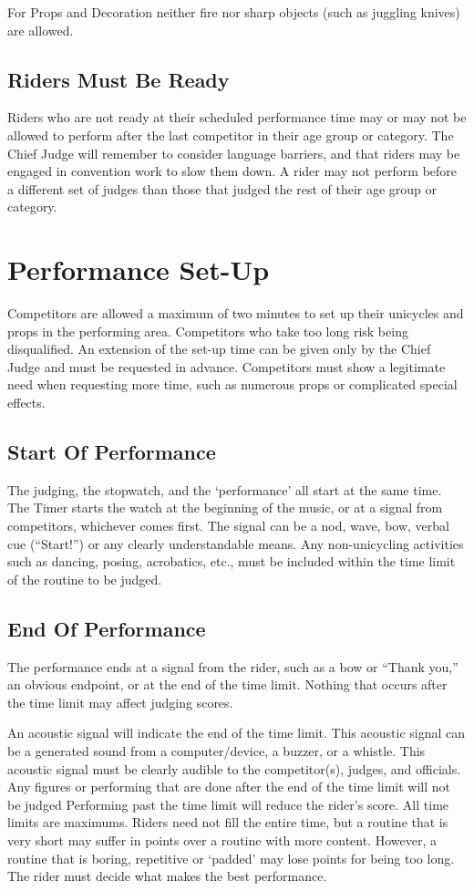 For Props and Decoration neither fire nor sharp objects (such as juggling knives) are allowed.

\subsection{Riders Must Be Ready}
Riders who are not ready at their scheduled performance time may or may not be allowed to perform after the last competitor in their age group or category.
The Chief Judge will remember to consider language barriers, and that riders may be engaged in convention work to slow them down.
A rider may not perform before a different set of judges than those that judged the rest of their age group or category.

\section{Performance Set-Up}
Competitors are allowed a maximum of two minutes to set up their unicycles and props in the performing area.
Competitors who take too long risk being disqualified.
An extension of the set-up time can be given only by the Chief Judge and must be requested in advance.
Competitors must show a legitimate need when requesting more time, such as numerous props or complicated special effects.

\subsection{Start Of Performance}
The judging, the stopwatch, and the `performance' all start at the same time.
The Timer starts the watch at the beginning of the music, or at a signal from competitors, whichever comes first.
The signal can be a nod, wave, bow, verbal cue (``Start!'') or any clearly understandable means.
Any non-unicycling activities such as dancing, posing, acrobatics, etc., must be included within the time limit of the routine to be judged.

\subsection{End Of Performance}
The performance ends at a signal from the rider, such as a bow or ``Thank you,'' an obvious endpoint, or at the end of the time limit.
Nothing that occurs after the time limit may affect judging scores.

An acoustic signal will indicate the end of the time limit.
This acoustic signal can be a generated sound from a computer/device, a buzzer, or a whistle.
This acoustic signal must be clearly audible to the competitor(s), judges, and officials.
Any figures or performing that are done after the end of the time limit will not be judged Performing past the time limit will reduce the rider's score.
All time limits are maximums.
Riders need not fill the entire time, but a routine that is very short may suffer in points over a routine with more content.
However, a routine that is boring, repetitive or `padded' may lose points for being too long.
The rider must decide what makes the best performance.


